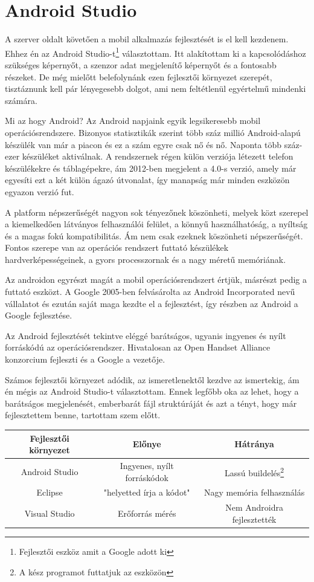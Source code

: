 \documentclass{thesis-ekf}
\theoremstyle{definition}
\theoremstyle{remark}
\begin{document}
\section{Android Studio}
A szerver oldalt követően a mobil alkalmazás fejlesztését is el kell kezdenem. Ehhez én az Android Studio-t\footnote{Fejlesztői eszköz amit a Google adott ki} választottam. Itt alakítottam ki a kapcsolódáshoz szükséges képernyőt, a szenzor adat megjelenítő képernyőt és a fontosabb részeket. De még mielőtt belefolynánk ezen fejlesztői környezet szerepét, tisztáznunk kell pár lényegesebb dolgot, ami nem feltétlenül egyértelmű mindenki számára.
\par Mi az hogy Android? Az Android napjaink egyik legsikeresebb mobil  operációsrendszere. Bizonyos statisztikák szerint több száz millió Android-alapú készülék van már a piacon és ez a szám egyre csak nő és nő. Naponta több száz-ezer készüléket aktiválnak. A rendszernek régen külön verziója létezett telefon készülékekre és táblagépekre, ám 2012-ben megjelent a 4.0-s verzió, amely már egyesíti ezt a két külön ágazó útvonalat, így manapság már minden eszközön egyazon verzió fut.
\par A platform népszerűségét nagyon sok tényezőnek köszönheti, melyek közt szerepel a kiemelkedően látványos felhasználói felület, a könnyű használhatóság, a nyíltság és a magas fokú kompatibilitás. Ám nem csak ezeknek köszönheti népszerűségét. Fontos szerepe van az operációs rendszert futtató készülékek hardverképességeinek, a gyors processzornak és a nagy méretű memóriának.
\par Az androidon egyrészt magát a mobil operációsrendszert értjük, másrészt pedig a futtató eszközt. A Google 2005-ben felvásárolta az Android Incorporated nevű vállalatot és ezután saját maga kezdte el a fejlesztést, így részben az Android a Google fejlesztése.
\par Az Android fejlesztését tekintve eléggé barátságos, ugyanis ingyenes és nyílt forráskódú az operációsrendszer. Hivatalosan az Open Handset Alliance konzorcium fejleszti és a Google a vezetője.
\par Számos fejlesztői környezet adódik, az ismeretlenektől kezdve az ismertekig, ám én mégis az Android Studio-t választottam. Ennek legfőbb oka az lehet, hogy a barátságos megjelenését, emberbarát fájl struktúráját és azt a tényt, hogy már fejlesztettem benne, tartottam szem előtt.
\begin{center}
	\begin{tabular}{ |c|c|c| } 
		\hline
		Fejlesztői környezet & Előnye & Hátránya \\
		\hline\hline
		Android Studio & Ingyenes, nyílt forráskódok & Lassú buildelés\footnote{A kész programot futtatjuk az eszközön}  \\
		\hline
		Eclipse & "helyetted írja a kódot" & Nagy memória felhasználás\\
		\hline
		Visual Studio & Erőforrás mérés & Nem Androidra fejlesztették \\
		\hline
	\end{tabular}
\end{center}
\end{document}
